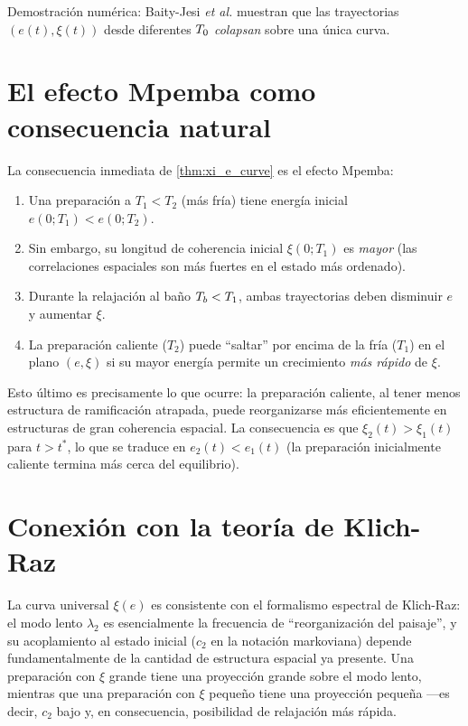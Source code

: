 \noindent Demostración numérica: Baity-Jesi \emph{et al.} muestran que las 
trayectorias $(e(t), \xi(t))$ desde diferentes $T_{0}$ \emph{colapsan} sobre 
una única curva.

\section{El efecto Mpemba como consecuencia natural}

La consecuencia inmediata de \cref{thm:xi_e_curve} es el efecto Mpemba:

\begin{enumerate}
\item Una preparación a $T_{1} < T_{2}$ (más fría) tiene energía inicial 
$e(0; T_1) < e(0; T_2)$.
\item Sin embargo, su longitud de coherencia inicial $\xi(0; T_1)$ es 
\emph{mayor} (las correlaciones espaciales son más fuertes en el estado más 
ordenado).
\item Durante la relajación al baño $T_{b} < T_1$, ambas trayectorias deben 
disminuir $e$ y aumentar $\xi$.
\item La preparación caliente ($T_2$) puede ``saltar'' por encima de la fría 
($T_1$) en el plano $(e, \xi)$ si su mayor energía permite un crecimiento 
\emph{más rápido} de $\xi$.
\end{enumerate}

\noindent Esto último es precisamente lo que ocurre: la preparación caliente, 
al tener menos estructura de ramificación atrapada, puede reorganizarse más 
eficientemente en estructuras de gran coherencia espacial. La consecuencia es 
que $\xi_{2}(t) > \xi_{1}(t)$ para $t > t^{\ast}$, lo que se traduce en 
$e_{2}(t) < e_{1}(t)$ (la preparación inicialmente caliente termina más cerca 
del equilibrio).

\section{Conexión con la teoría de Klich-Raz}

La curva universal $\xi(e)$ es consistente con el formalismo espectral de 
Klich-Raz: el modo lento $\lambda_2$ es esencialmente la frecuencia de 
``reorganización del paisaje'', y su acoplamiento al estado inicial 
($c_2$ en la notación markoviana) depende fundamentalmente de la cantidad de 
estructura espacial ya presente. Una preparación con $\xi$ grande tiene una 
proyección grande sobre el modo lento, mientras que una preparación con $\xi$ 
pequeño tiene una proyección pequeña ---es decir, $c_2$ bajo y, en consecuencia, 
posibilidad de relajación más rápida.

